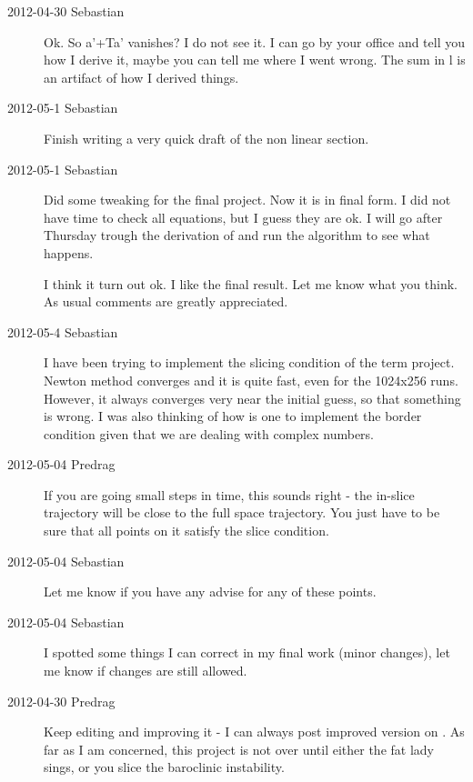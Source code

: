 \begin{description}
\item[2012-04-30 Sebastian]
Ok. So a'+Ta' vanishes? I do not see it. I can go by your office and tell
you how I derive it, maybe you can tell me where I went wrong. The sum in
l is an artifact of how I derived things.

\item[2012-05-1 Sebastian]
Finish writing a very quick draft of the non linear section.

\item[2012-05-1 Sebastian]
Did some tweaking for the final project. Now it is in final form. I did
not have time to check all equations, but I guess they are ok. I will go
after Thursday trough the derivation of  and run the
algorithm to see what happens.

I think it turn out ok. I like the final result. Let me know what you
think. As usual comments are greatly appreciated.

\item[2012-05-4 Sebastian]
I have been trying to implement the slicing condition of the term
project. Newton method converges and it is quite fast, even for the
1024x256 runs. However, it always converges very near the initial guess,
so that something is wrong. I was also thinking of how is one to
implement the border condition given that we are dealing with complex
numbers.

\item[2012-05-04 Predrag] If you are going small steps in time, this
sounds right - the in-slice trajectory will be close to the full space
trajectory. You just have to be sure that all points on it satisfy the
slice condition.

\item[2012-05-04 Sebastian] Let me know if you have any advise for any of
these points.


\item[2012-05-04 Sebastian]
I spotted some things I can correct in my final work (minor changes), let
me know if changes are still allowed.

\item[2012-04-30 Predrag]
Keep editing and improving it - I can always post improved version on
. As far as I
am concerned, this project is not over until either the fat lady sings,
or you slice the baroclinic instability.


\end{description}
